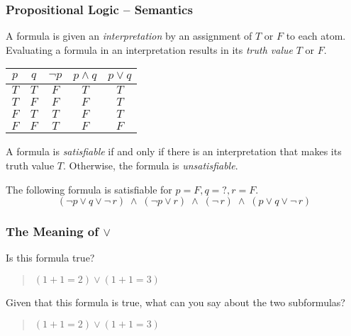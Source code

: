 \documentclass{beamer}
\begin{document}
\begin{frame}
\frametitle{Propositional Logic -- Semantics}

A formula is given an \emph{interpretation} by an assignment of $T$ or $F$ to each atom. Evaluating a formula in an interpretation results in its \emph{truth value} $T$ or $F$. 

\begin{center}
\begin{tabular}{|c|c||c||c||c|}
\hline
$p$ & $q$ &$\neg p$ &$p \wedge q$& $p \vee q$ \\ \hline \hline
$T$ & $T$ & $F$ &$T$ & $T$  \\ \hline
$T$ & $F$ & $F$ &$F$ & $T$ \\ \hline
$F$ & $T$ & $T$ &$F$ & $T$ \\ \hline
$F$ & $F$ & $T$ &$F$ & $F$ \\ \hline
\end{tabular}
\end{center}

\pause

A formula is \emph{satisfiable} if and only if there is an interpretation that makes its truth value $T$. Otherwise, the formula is \emph{unsatisfiable}.

\pause

The following formula is satisfiable for $p=F,q=?,r=F$.
\[
(\neg p \vee q \vee \neg \,r) \;\wedge\; (\neg p \vee r)
\;\wedge\; (\neg \,r)\;\wedge\;(p \vee q \vee \neg \,r)
\]

\end{frame}


\begin{frame}
\frametitle{The Meaning of $\vee$}

Is this formula true?
\begin{quote}
$(1+1=2) \vee (1+1=3)$
\end{quote}
\pause

\bigskip

Given that this formula is true, what can you say about the two subformulas?
\begin{quote}
$(1+1=2) \vee (1+1=3)$
\end{quote}

\end{frame}

\end{document}
